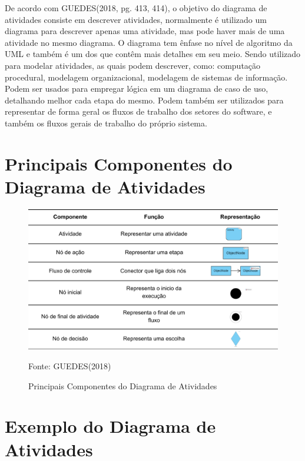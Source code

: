 \documentclass[12pt,openright,oneside,a4paper,
	chapter=TITLE,
	section=TITLE,
	english,brazil]{abntex2}
\begin{document}
De acordo com GUEDES(2018, pg. 413, 414), o objetivo do diagrama de atividades consiste em descrever atividades, normalmente é utilizado um diagrama para descrever apenas uma atividade, mas pode haver mais de uma atividade no mesmo diagrama. O diagrama tem ênfase no nível de algoritmo da UML e também é um dos que contêm mais detalhes em seu meio. Sendo utilizado para modelar atividades, as quais podem descrever, como: computação procedural, modelagem organizacional, modelagem de sistemas de informação. Podem ser usados para empregar lógica em um diagrama de caso de uso, detalhando melhor cada etapa do mesmo. Podem também ser utilizados para representar de forma geral os fluxos de trabalho dos setores do software, e também os fluxos gerais de trabalho do próprio sistema.

\pagebreak
\section{Principais Componentes do Diagrama de Atividades}

\begin{figure}[!htp]
	\caption{Principais Componentes do Diagrama de Atividades}
	\centering
	\includegraphics[scale=0.2]{img/PrincipaisCompAtividades.png}
	\\

	\footnotesize\raggedright Fonte: GUEDES(2018)
\end{figure}

\section{Exemplo do Diagrama de Atividades}
\end{document}
